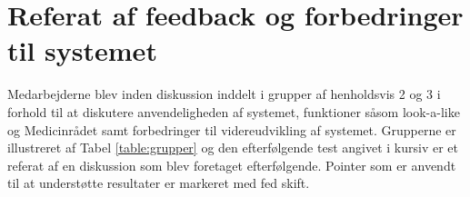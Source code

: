 

\newpage
\section{Referat af feedback og forbedringer til systemet} \label{App:Referat}
Medarbejderne blev inden diskussion inddelt i grupper af henholdsvis 2 og 3 i forhold til at diskutere anvendeligheden af systemet, funktioner såsom look-a-like og Medicinrådet samt forbedringer til videreudvikling af systemet. Grupperne er illustreret af Tabel \ref{table:grupper} og den efterfølgende test angivet i kursiv er et referat af en diskussion som blev foretaget efterfølgende. Pointer som er anvendt til at understøtte resultater er markeret med fed skift.

